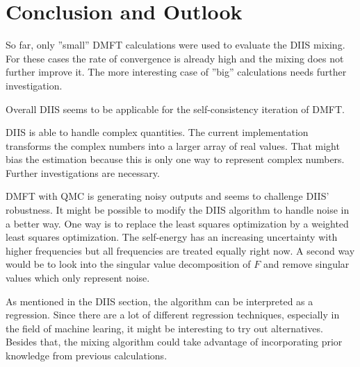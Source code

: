 \chapter{Conclusion and Outlook}
\label{ch:conclusion_outlook}
So far, only ''small'' DMFT calculations were used to evaluate the DIIS mixing. For these cases the rate of convergence is already high and the mixing does not further improve it. The more interesting case of ''big'' calculations needs further investigation.

Overall DIIS seems to be applicable for the self-consistency iteration of DMFT.

DIIS is able to handle complex quantities. The current implementation transforms the complex numbers into a larger array of real values. That might bias the estimation because this is only one way to represent complex numbers. Further investigations are necessary.

DMFT with QMC is generating noisy outputs and seems to challenge DIIS' robustness. It might be possible to modify the DIIS algorithm to handle noise in a better way. One way is to replace the least squares optimization by a weighted least squares optimization. The self-energy has an increasing uncertainty with higher frequencies but all frequencies are treated equally right now. A second way would be to look into the singular value decomposition of $F$ and remove singular values which only represent noise.

As mentioned in the DIIS section, the algorithm can be interpreted as a regression. Since there are a lot of different regression techniques, especially in the field of machine learing, it might be interesting to try out alternatives. Besides that, the mixing algorithm could take advantage of incorporating prior knowledge from previous calculations.

